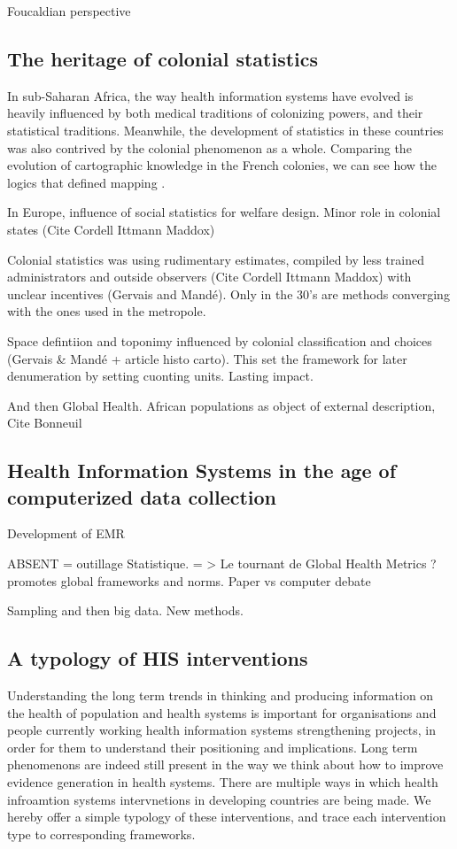 Foucaldian perspective

\subsection{The heritage of colonial statistics}

In sub-Saharan Africa, the way health information systems have evolved is heavily influenced by both medical traditions of colonizing powers, and their statistical traditions. Meanwhile, the development of statistics in these countries was also contrived by the colonial phenomenon as a whole. Comparing the evolution of cartographic knowledge in the French colonies, we can see how the logics that defined mapping \cite{appadurai_number_1996}.

In Europe, influence of social statistics for welfare design. Minor role in colonial states (Cite Cordell Ittmann  Maddox)

Colonial statistics was using rudimentary estimates, compiled by less trained administrators and outside observers (Cite Cordell Ittmann  Maddox) with unclear incentives (Gervais and Mandé). Only in the 30's are methods converging with the ones used in the metropole.

Space defintiion and toponimy influenced by colonial classification and choices (Gervais \& Mandé + article histo carto). This set the framework for later denumeration by setting cuonting units. Lasting impact.

And then Global Health. African populations as object of external description, Cite Bonneuil

\subsection{Health Information Systems in the age of computerized data collection}

Development of EMR

ABSENT = outillage Statistique. = > Le tournant de Global Health Metrics ? \cite{health_metrics_network_framework_2008} promotes global frameworks and norms.
Paper vs computer debate

Sampling and then big data. New methods.


\subsection{A typology of HIS interventions}

Understanding the long term trends in thinking and producing information on the health of population and health systems is important for organisations and people currently working health information systems strengthening projects, in order for them to understand their positioning and implications. Long term phenomenons are indeed still present in the way we think about how to improve evidence generation in health systems. There are multiple ways in which health infroamtion systems intervnetions in developing countries are being made. We hereby offer a simple typology of these interventions, and trace each intervention type to corresponding frameworks.

